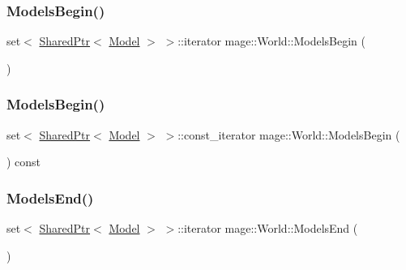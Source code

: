 \hypertarget{classmage_1_1_world_acdbf2922c2b755fb9ff368b3bab3edb1}{}\label{classmage_1_1_world_acdbf2922c2b755fb9ff368b3bab3edb1} 
\subsubsection{\texorpdfstring{Models\+Begin()}{ModelsBegin()}\hspace{0.1cm}{\footnotesize\ttfamily [1/2]}}
{\footnotesize\ttfamily set$<$ \hyperlink{namespacemage_a1e01ae66713838a7a67d30e44c67703e}{Shared\+Ptr}$<$ \hyperlink{classmage_1_1_model}{Model} $>$ $>$\+::iterator mage\+::\+World\+::\+Models\+Begin (\begin{DoxyParamCaption}{ }\end{DoxyParamCaption})}

\hypertarget{classmage_1_1_world_a38b6ada350e36132f94df20fb0365177}{}\label{classmage_1_1_world_a38b6ada350e36132f94df20fb0365177} 
\subsubsection{\texorpdfstring{Models\+Begin()}{ModelsBegin()}\hspace{0.1cm}{\footnotesize\ttfamily [2/2]}}
{\footnotesize\ttfamily set$<$ \hyperlink{namespacemage_a1e01ae66713838a7a67d30e44c67703e}{Shared\+Ptr}$<$ \hyperlink{classmage_1_1_model}{Model} $>$ $>$\+::const\+\_\+iterator mage\+::\+World\+::\+Models\+Begin (\begin{DoxyParamCaption}{ }\end{DoxyParamCaption}) const}

\hypertarget{classmage_1_1_world_aa52fa727f94a855e55d9fed72be8fd60}{}\label{classmage_1_1_world_aa52fa727f94a855e55d9fed72be8fd60} 
\subsubsection{\texorpdfstring{Models\+End()}{ModelsEnd()}\hspace{0.1cm}{\footnotesize\ttfamily [1/2]}}
{\footnotesize\ttfamily set$<$ \hyperlink{namespacemage_a1e01ae66713838a7a67d30e44c67703e}{Shared\+Ptr}$<$ \hyperlink{classmage_1_1_model}{Model} $>$ $>$\+::iterator mage\+::\+World\+::\+Models\+End (\begin{DoxyParamCaption}{ }\end{DoxyParamCaption})}

